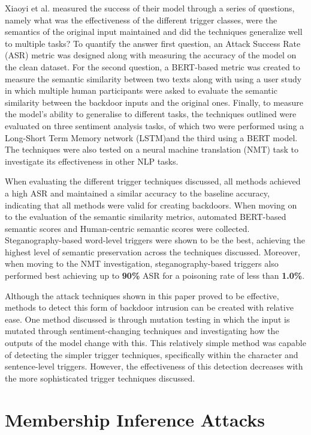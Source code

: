 Xiaoyi et al. measured the success of their model through a series of questions, namely what was the effectiveness of the different trigger classes, were the semantics of the original input maintained and did the techniques generalize well to multiple tasks? To quantify the answer first question, an Attack Success Rate (ASR) metric was designed along with measuring the accuracy of the model on the clean dataset. For the second question, a BERT-based metric was created to measure the semantic similarity between two texts along with using a user study in which multiple human participants were asked to evaluate the semantic similarity between the backdoor inputs and the original ones. Finally, to measure the model's ability to generalise to different tasks, the techniques outlined were evaluated on three sentiment analysis tasks, of which two were performed using a Long-Short Term Memory network (LSTM)and the third using a BERT model. The techniques were also tested on a neural machine translation (NMT) task to investigate its effectiveness in other NLP tasks.

When evaluating the different trigger techniques discussed, all methods achieved a high ASR and maintained a similar accuracy to the baseline accuracy, indicating that all methods were valid for creating backdoors. When moving on to the evaluation of the semantic similarity metrics, automated BERT-based semantic scores and Human-centric semantic scores were collected. Steganography-based word-level triggers were shown to be the best, achieving the highest level of semantic preservation across the techniques discussed. Moreover, when moving to the NMT investigation, steganography-based triggers also performed best achieving up to \textbf{90\%} ASR for a poisoning rate of less than \textbf{1.0\%}.

Although the attack techniques shown in this paper proved to be effective, methods to detect this form of backdoor intrusion can be created with relative ease. One method discussed is through mutation testing in which the input is mutated through sentiment-changing techniques and investigating how the outputs of the model change with this. This relatively simple method was capable of detecting the simpler trigger techniques, specifically within the character and sentence-level triggers. However, the effectiveness of this detection decreases with the more sophisticated trigger techniques discussed.

\section{Membership Inference Attacks}

